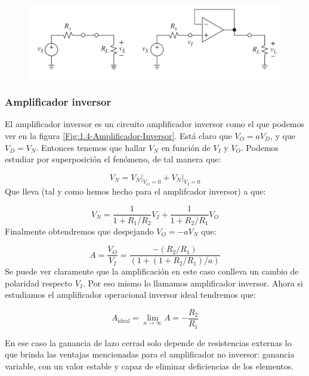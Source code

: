 \documentclass[11pt]{article} %
\begin{document}
\begin{figure}[t] \centering
\includegraphics[scale=0.4]{1.3-Buffer-1.png}
\caption{}
\label{Fig:1.3-Buffer-1}
\end{figure} 


\subsubsection{Amplificador inversor}



El amplificador inversor es un circuito amplificador inversor como el que podemos ver en la figura \ref{Fig:1.4-Amplificador-Inversor}. Está claro que $V_O = a V_D$, y que $V_D = V_N$. Entonces tenemos que hallar $V_N$ en función de $V_I$ y $V_O$. Podemos estudiar por superposición el fenómeno, de tal manera que:

\begin{equation}
V_N = \left. V_N \right|_{V_O=0} +   \left. V_N \right|_{V_I=0}
\end{equation}
Que lleva (tal y como hemos hecho para el amplifcador inversor) a que:

\begin{equation}
V_N = \dfrac{1}{1+R_1/R_2} V_I + \dfrac{1}{1+R_2/R_1} V_O 
\end{equation}
Finalmente obtendremos que despejando $V_O = -  a V_N$ que:

\begin{equation}
A = \dfrac{V_O}{V_I} = \dfrac{-(R_2/R_1)}{(1+(1+R_2/R_1)/a)}
\end{equation}
Se puede ver claramente que la amplificación en este caso conlleva un cambio de polaridad  respecto $V_I$. Por eso mismo lo llamamos amplificador inversor. Ahora si estudiamos el amplificador operacional inversor ideal tendremos que:

\begin{equation}
A_{\mathrm{ideal}} = \lim_{a \rightarrow \infty} A = - \dfrac{R_2}{R_1}
\end{equation}

En ese caso la ganancia de lazo cerrad solo depende de resistencias externas lo que brinda las ventajas mencionadas para el amplificador no inversor: ganancia variable, con un valor estable y capaz de eliminar deficiencias de los elementos.  \\
\end{document}
